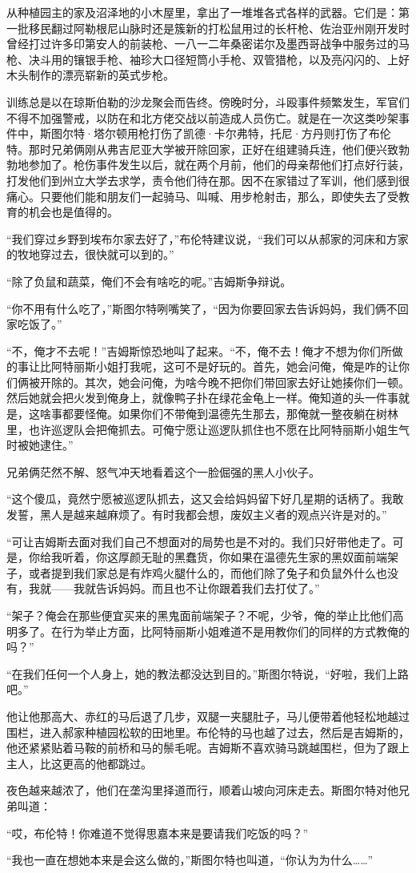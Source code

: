 \par 从种植园主的家及沼泽地的小木屋里，拿出了一堆堆各式各样的武器。它们是：第一批移民翻过阿勒根尼山脉时还是簇新的打松鼠用过的长杆枪、佐治亚州刚开发时曾经打过许多印第安人的前装枪、一八一二年桑密诺尔及墨西哥战争中服务过的马枪、决斗用的镶银手枪、袖珍大口径短筒小手枪、双管猎枪，以及亮闪闪的、上好木头制作的漂亮崭新的英式步枪。
\par 训练总是以在琼斯伯勒的沙龙聚会而告终。傍晚时分，斗殴事件频繁发生，军官们不得不加强警戒，以防在和北方佬交战以前造成人员伤亡。就是在一次这类吵架事件中，斯图尔特·塔尔顿用枪打伤了凯德·卡尔弗特，托尼·方丹则打伤了布伦特。那时兄弟俩刚从弗吉尼亚大学被开除回家，正好在组建骑兵连，他们便兴致勃勃地参加了。枪伤事件发生以后，就在两个月前，他们的母亲帮他们打点好行装，打发他们到州立大学去求学，责令他们待在那。因不在家错过了军训，他们感到很痛心。只要他们能和朋友们一起骑马、叫喊、用步枪射击，那么，即使失去了受教育的机会也是值得的。
\par “我们穿过乡野到埃布尔家去好了，”布伦特建议说，“我们可以从郝家的河床和方家的牧地穿过去，很快就可以到的。”
\par “除了负鼠和蔬菜，俺们不会有啥吃的呢。”吉姆斯争辩说。
\par “你不用有什么吃了，”斯图尔特咧嘴笑了，“因为你要回家去告诉妈妈，我们俩不回家吃饭了。”
\par “不，俺才不去呢！”吉姆斯惊恐地叫了起来。“不，俺不去！俺才不想为你们所做的事让比阿特丽斯小姐打我呢，这可不是好玩的。首先，她会问俺，俺是咋的让你们俩被开除的。其次，她会问俺，为啥今晚不把你们带回家去好让她揍你们一顿。然后她就会把火发到俺身上，就像鸭子扑在绿花金龟上一样。俺知道的头一件事就是，这啥事都要怪俺。如果你们不带俺到温德先生那去，那俺就一整夜躺在树林里，也许巡逻队会把俺抓去。可俺宁愿让巡逻队抓住也不愿在比阿特丽斯小姐生气时被她逮住。”
\par 兄弟俩茫然不解、怒气冲天地看着这个一脸倔强的黑人小伙子。
\par “这个傻瓜，竟然宁愿被巡逻队抓去，这又会给妈妈留下好几星期的话柄了。我敢发誓，黑人是越来越麻烦了。有时我都会想，废奴主义者的观点兴许是对的。”
\par “可让吉姆斯去面对我们自己不想面对的局势也是不对的。我们只好带他走了。可是，你给我听着，你这厚颜无耻的黑蠢货，你如果在温德先生家的黑奴面前端架子，或者提到我们家总是有炸鸡火腿什么的，而他们除了兔子和负鼠外什么也没有，我就——我就告诉妈妈。而且也不让你跟着我们去打仗了。”
\par “架子？俺会在那些便宜买来的黑鬼面前端架子？不呢，少爷，俺的举止比他们高明多了。在行为举止方面，比阿特丽斯小姐难道不是用教你们的同样的方式教俺的吗？”
\par “在我们任何一个人身上，她的教法都没达到目的。”斯图尔特说，“好啦，我们上路吧。”
\par 他让他那高大、赤红的马后退了几步，双腿一夹腿肚子，马儿便带着他轻松地越过围栏，进入郝家种植园松软的田地里。布伦特的马也越了过去，然后是吉姆斯的，他还紧紧贴着马鞍的前桥和马的鬃毛呢。吉姆斯不喜欢骑马跳越围栏，但为了跟上主人，比这更高的他都跳过。
\par 夜色越来越浓了，他们在垄沟里择道而行，顺着山坡向河床走去。斯图尔特对他兄弟叫道：
\par “哎，布伦特！你难道不觉得思嘉本来是要请我们吃饭的吗？”
\par “我也一直在想她本来是会这么做的，”斯图尔特也叫道，“你认为为什么……”


